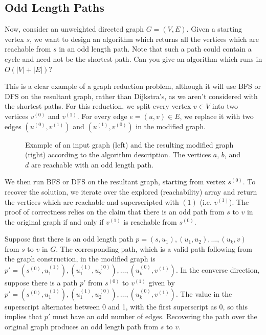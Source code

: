 \documentclass[11pt]{article}
\begin{document}
\subsection{Odd Length Paths}
Now, consider an unweighted directed graph $G = (V, E)$. Given a starting vertex $s$, we want to design an algorithm which returns all the vertices which are reachable from $s$ in an odd length path. Note that such a path could contain a cycle and need not be the shortest path. Can you give an algorithm which runs in $O(|V| + |E|)$?

This is a clear example of a graph reduction problem, although it will use BFS or DFS on the resultant graph, rather than Dijkstra's, as we aren't considered with the shortest paths. For this reduction, we split every vertex $v \in V$ into two vertices $v^{(0)}$ and $v^{(1)}$. For every edge $e = (u, v) \in E$, we replace it with two edges $(u^{(0)}, v^{(1)})$ and $(u^{(1)}, v^{(0)})$ in the modified graph. 

\begin{figure}[H]
    \begin{center}
        
    \end{center}
    \caption{Example of an input graph (left) and the resulting modified graph (right) according to the algorithm description. The vertices $a$, $b$, and $d$ are reachable with an odd length path.}
\end{figure}

We then run BFS or DFS on the resultant graph, starting from vertex $s^{(0)}$. To recover the solution, we iterate over the explored (reachability) array and return the vertices which are reachable and superscripted with $(1)$ (i.e. $v^{(1)}$). The proof of correctness relies on the claim that there is an odd path from $s$ to $v$ in the original graph if and only if $v^{(1)}$ is reachable from $s^{(0)}$.

Suppose first there is an odd length path $p = (s, u_1), (u_1, u_2), \dots, (u_k, v)$ from $s$ to $v$ in $G$. The corresponding path, which is a valid path following from the graph construction, in the modified graph is $p' = (s^{(0)}, u_1^{(1)}), (u_1^{(1)}, u_2^{(0)}), \dots, (u_k^{(0)}, v^{(1)})$. In the converse direction, suppose there is a path $p'$ from $s^{(0)}$ to $v^{(1)}$ given by $p' = (s^{(0)}, u_1^{(1)}), (u_1^{(1)}, u_2^{(0)}), \dots, (u_k^{(0)}, v^{(1)})$. The value in the superscript alternates between 0 and 1, with the first superscript as 0, so this implies that $p'$ must have an odd number of edges. Recovering the path over the original graph produces an odd length path from $s$ to $v$. 
\end{document}
